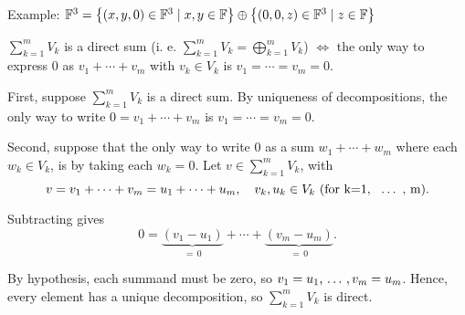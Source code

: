 \begin{example}
  Example: $\mathbb{F}^3 =
  \left \{ \left ( x, y, 0 \right ) \in \mathbb{F}^3 \mid x,y \in \mathbb{F} \right \}
  \oplus
  \left \{ \left (  0, 0, z  \right ) \in \mathbb{F}^3 \mid z \in \mathbb{F} \right \}$
\end{example}


\setcounter{thm}{44}
\begin{thm} 
  \label{thm: condition for a direct sum}
  $\sum_{k=1}^m V_k$ is a direct sum (i. e. $\sum_{k=1}^m V_k = \bigoplus_{k=1}^m V_k$) $\iff$ the only way to express $0$ as $v_1 + \cdots + v_m$ with $v_k \in V_k$ is $v_1 = \cdots = v_m = 0$.
\end{thm}
\begin{prf}
    \Rightarrowdirection
    First, suppose $\sum_{k=1}^m V_k$ is a direct sum.
    By uniqueness of decompositions, the only way to write $0 = v_1 + \cdots + v_m$ is $v_1 = \cdots = v_m = 0$.

    \Leftarrowdirection Second, suppose that the only way to write $0$ as a sum $w_1 + \cdots + w_m$ where each $w_k \in V_k$, is by taking each $w_k = 0$. Let $v \in \sum_{k=1}^m V_k$, with
    \begin{equation}
        v = v_1 + \cdots + v_m = u_1 + \cdots + u_m, \quad v_k, u_k \in V_k \text{ (for k=1, {\, \ldots \,\,}, m)} .
    \end{equation}

    Subtracting gives
    \begin{equation}
      0= \underbrace{(v_1-u_1)}_{= \, 0}+\cdots+\underbrace{(v_m-u_m)}_{= \, 0}.
    \end{equation}

    By hypothesis, each summand must be zero, so $v_1=u_1, {\, \ldots \,\,}, v_m=u_m$.
    Hence, every element has a unique decomposition, so $\sum_{k=1}^m V_k$ is direct.
\end{prf}

